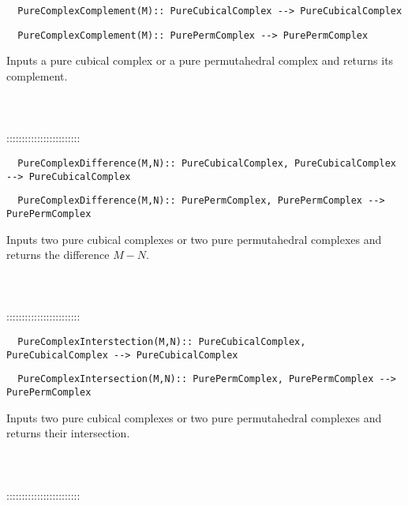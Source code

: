 \documentclass[a4paper,11pt]{report}
\begin{document}
{\begin{verbatim}  PureComplexComplement(M):: PureCubicalComplex --> PureCubicalComplex
\end{verbatim}
 
\begin{verbatim}  PureComplexComplement(M):: PurePermComplex --> PurePermComplex
\end{verbatim}


 

 Inputs a pure cubical complex or a pure permutahedral complex and returns its
complement. \\
 \\
 \\
 \\
 ::::::::::::::::::::::::\\
 
\begin{verbatim}  PureComplexDifference(M,N):: PureCubicalComplex, PureCubicalComplex --> PureCubicalComplex
\end{verbatim}
 
\begin{verbatim}  PureComplexDifference(M,N):: PurePermComplex, PurePermComplex --> PurePermComplex
\end{verbatim}


 

 Inputs two pure cubical complexes or two pure permutahedral complexes and
returns the difference $ M - N$. \\
 \\
 \\
 \\
 ::::::::::::::::::::::::\\
 
\begin{verbatim}  PureComplexInterstection(M,N):: PureCubicalComplex, PureCubicalComplex --> PureCubicalComplex
\end{verbatim}
 
\begin{verbatim}  PureComplexIntersection(M,N):: PurePermComplex, PurePermComplex --> PurePermComplex
\end{verbatim}


 

 Inputs two pure cubical complexes or two pure permutahedral complexes and
returns their intersection. \\
 \\
 \\
 \\
 ::::::::::::::::::::::::\\
 
}
\end{document}
